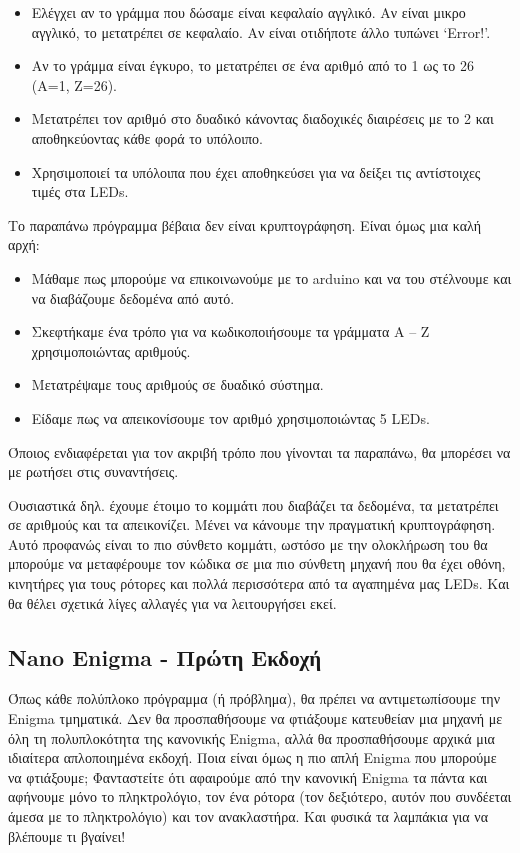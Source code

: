 \documentclass[a4paper,twoside,12pt]{article}
\begin{document}
\begin{itemize}
\item Ελέγχει αν το γράμμα που δώσαμε είναι κεφαλαίο αγγλικό. Αν είναι μικρο αγγλικό, το μετατρέπει σε κεφαλαίο. Αν είναι οτιδήποτε άλλο τυπώνει `Error!'.
\item Αν το γράμμα είναι έγκυρο, το μετατρέπει σε ένα αριθμό από το 1 ως το 26 (Α=1, Ζ=26).
\item Μετατρέπει τον αριθμό στο δυαδικό κάνοντας διαδοχικές διαιρέσεις με το 2 και αποθηκεύοντας κάθε φορά το υπόλοιπο.
\item Χρησιμοποιεί τα υπόλοιπα που έχει αποθηκεύσει για να δείξει τις αντίστοιχες τιμές στα LEDs.
\end{itemize}

Το παραπάνω πρόγραμμα βέβαια δεν είναι κρυπτογράφηση. Είναι όμως μια καλή αρχή:

\begin{itemize}
\item Μάθαμε πως μπορούμε να επικοινωνούμε με το arduino και να του στέλνουμε και να διαβάζουμε δεδομένα από αυτό.
\item Σκεφτήκαμε ένα τρόπο για να κωδικοποιήσουμε τα γράμματα A -- Z χρησιμοποιώντας αριθμούς.
\item Μετατρέψαμε τους αριθμούς σε δυαδικό σύστημα.
\item Είδαμε πως να απεικονίσουμε τον αριθμό χρησιμοποιώντας 5 LEDs.
\end{itemize}

Όποιος ενδιαφέρεται για τον ακριβή τρόπο που γίνονται τα παραπάνω, θα μπορέσει να με ρωτήσει στις συναντήσεις.

Ουσιαστικά δηλ. έχουμε έτοιμο το κομμάτι που διαβάζει τα δεδομένα, τα μετατρέπει σε αριθμούς και τα απεικονίζει. Μένει να κάνουμε την πραγματική κρυπτογράφηση. Αυτό προφανώς είναι το πιο σύνθετο κομμάτι, ωστόσο με την ολοκλήρωση του θα μπορούμε να μεταφέρουμε τον κώδικα σε μια πιο σύνθετη μηχανή που θα έχει οθόνη, κινητήρες για τους ρότορες και πολλά περισσότερα από τα αγαπημένα μας LEDs. Και θα θέλει σχετικά λίγες αλλαγές για να λειτουργήσει εκεί.

\subsection{Nano Enigma - Πρώτη Εκδοχή}

Όπως κάθε πολύπλοκο πρόγραμμα (ή πρόβλημα), θα πρέπει να αντιμετωπίσουμε την Enigma τμηματικά. Δεν θα προσπαθήσουμε να φτιάξουμε κατευθείαν μια μηχανή με όλη τη πολυπλοκότητα της κανονικής Enigma, αλλά θα προσπαθήσουμε αρχικά μια ιδιαίτερα απλοποιημένα εκδοχή. Ποια είναι όμως η πιο απλή Enigma που μπορούμε να φτιάξουμε; Φανταστείτε ότι αφαιρούμε από την κανονική Enigma τα πάντα και αφήνουμε μόνο το πληκτρολόγιο, τον ένα ρότορα (τον δεξιότερο, αυτόν που συνδέεται άμεσα με το πληκτρολόγιο) και τον ανακλαστήρα.  Και φυσικά τα λαμπάκια για να βλέπουμε τι βγαίνει!
\end{document}
